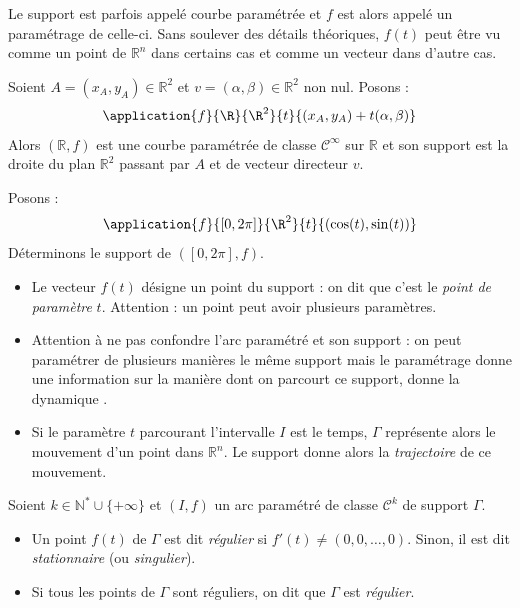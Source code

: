 \documentclass[french,11pt,twoside]{VcCours}
\begin{document}
\begin{Remarque}{} Le support est parfois appelé courbe paramétrée et $f$ est alors appelé un paramétrage de celle-ci. Sans soulever des détails théoriques, $f(t)$ peut être vu comme un point de $\mathbb{R}^n$ dans certains cas et comme un vecteur dans d'autre cas.
\end{Remarque}

\medskip

\begin{Exemple} Soient $A=(x_A,y_A) \in \mathbb{R}^2$ et $v= (\alpha, \beta) \in \mathbb{R}^2$ non nul. Posons :
	\[\application{f}{\R}{\R^2}{t}{(x_A,y_A) + t (\alpha, \beta)}\]
Alors $(\mathbb{R},f)$ est une courbe paramétrée de classe $\mathcal{C}^{\infty}$ sur $\mathbb{R}$ et son support est la droite du plan $\mathbb{R}^2$ passant par $A$ et de vecteur directeur $v$.
\end{Exemple}

\medskip

\begin{Exemple} Posons :
	\[\application{f}{[0,2\pi]}{\R^2}{t}{(\cos(t), \sin(t))}\]
Déterminons le support de $([0,2\pi],f)$.

\vspace{4cm}
\end{Exemple}

\begin{Remarques}{}
\begin{itemize}
\item Le vecteur $f(t)$ désigne un point du support : on dit que c'est le \emph{point de paramètre} $t$. Attention : un point peut avoir plusieurs paramètres.
\item Attention à ne pas confondre l'arc paramétré et son support : on peut paramétrer de plusieurs manières le même support mais le paramétrage donne une information sur la manière dont on parcourt ce support, donne la \og dynamique \fg .
\item Si le paramètre $t$ parcourant l'intervalle $I$ est le temps, $\Gamma$ représente alors le mouvement d'un point dans $\mathbb{R}^n$. Le support donne alors la \emph{trajectoire} de ce mouvement.
\end{itemize}
\end{Remarques}{}

\begin{Definition}{} Soient $k \in \mathbb{N}^* \cup \lbrace + \infty \rbrace$ et $(I,f)$ un arc paramétré de classe $\mathcal{C}^k$ de support $\Gamma$.

\begin{itemize}
\item Un point $f(t)$ de $\Gamma$ est dit \emph{régulier} si $f'(t) \neq (0,0, \ldots, 0)$. Sinon, il est dit \emph{stationnaire} (ou \emph{singulier}).
\item Si tous les points de $\Gamma$ sont réguliers, on dit que $\Gamma$ est \emph{régulier}.
\end{itemize}
\end{Definition}
\end{document}
